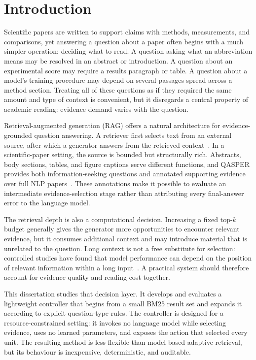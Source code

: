 \chapter{Introduction}
\label{chap:introduction}

Scientific papers are written to support claims with methods, measurements, and comparisons, yet answering a question about a paper often begins with a much simpler operation: deciding what to read. A question asking what an abbreviation means may be resolved in an abstract or introduction. A question about an experimental score may require a results paragraph or table. A question about a model's training procedure may depend on several passages spread across a method section. Treating all of these questions as if they required the same amount and type of context is convenient, but it disregards a central property of academic reading: evidence demand varies with the question.

Retrieval-augmented generation (RAG) offers a natural architecture for evidence-grounded question answering. A retriever first selects text from an external source, after which a generator answers from the retrieved context~\cite{lewis2020rag}. In a scientific-paper setting, the source is bounded but structurally rich. Abstracts, body sections, tables, and figure captions serve different functions, and QASPER provides both information-seeking questions and annotated supporting evidence over full NLP papers~\cite{dasigi2021qasper}. These annotations make it possible to evaluate an intermediate evidence-selection stage rather than attributing every final-answer error to the language model.

The retrieval depth is also a computational decision. Increasing a fixed top-$k$ budget generally gives the generator more opportunities to encounter relevant evidence, but it consumes additional context and may introduce material that is unrelated to the question. Long context is not a free substitute for selection: controlled studies have found that model performance can depend on the position of relevant information within a long input~\cite{liu2024lost}. A practical system should therefore account for evidence quality and reading cost together.

This dissertation studies that decision layer. It develops and evaluates a lightweight controller that begins from a small BM25 result set and expands it according to explicit question-type rules. The controller is designed for a resource-constrained setting: it invokes no language model while selecting evidence, uses no learned parameters, and exposes the action that selected every unit. The resulting method is less flexible than model-based adaptive retrieval, but its behaviour is inexpensive, deterministic, and auditable.

